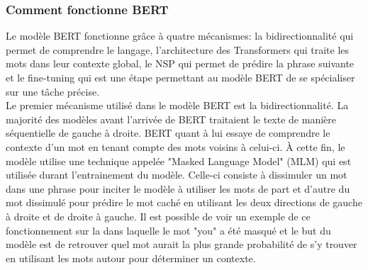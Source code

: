 \documentclass{rapport}
\begin{document}
\subsubsection{Comment fonctionne BERT}
Le modèle BERT fonctionne grâce à quatre mécanismes: la bidirectionnalité qui permet de comprendre le langage, l'architecture des Transformers qui traite les mots dans leur contexte global, le NSP qui permet de prédire la phrase suivante et le fine-tuning qui est une étape permettant au modèle BERT de se spécialiser sur une tâche précise.   \\

Le premier mécanisme utilisé dans le modèle BERT est la bidirectionnalité. La majorité des modèles avant l'arrivée de BERT traitaient le texte de manière séquentielle de gauche à droite. BERT quant à lui essaye de comprendre le contexte d'un mot en tenant compte des mots voisins à celui-ci. À cette fin, le modèle utilise une technique appelée "Masked Language Model" (MLM) qui est utilisée durant l'entrainement du modèle. Celle-ci consiste à dissimuler un mot dans une phrase pour inciter le modèle à utiliser les mots de part et d'autre du mot dissimulé pour prédire le mot caché en utilisant les deux directions de gauche à droite et de droite à gauche. Il est possible de voir un exemple de ce fonctionnement sur la  dans laquelle le mot "you" a été masqué et le but du modèle est de retrouver quel mot aurait la plus grande probabilité de s'y trouver en utilisant les mots autour pour déterminer un contexte.
\end{document}
